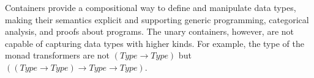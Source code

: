 \begin{code}%
\>[0]\AgdaSpace{}%
\AgdaSymbol{:}\AgdaSpace{}%
\AgdaSpace{}%
\AgdaSpace{}%
\AgdaSpace{}%
\AgdaSpace{}%
\<%
\\
\>[0]\AgdaSpace{}%
\AgdaSpace{}%
\AgdaSymbol{=}\AgdaSpace{}%
\<%
\\
\>[0]\AgdaSpace{}%
\AgdaSymbol{(}\AgdaSpace{}%
\AgdaSymbol{)}\AgdaSpace{}%
\AgdaSymbol{=}\AgdaSpace{}%
\<%
\\
\>[0]\AgdaSpace{}%
\AgdaSymbol{(}\AgdaSpace{}%
\AgdaSpace{}%
\AgdaSymbol{)}\AgdaSpace{}%
\AgdaSymbol{=}\AgdaSpace{}%
\AgdaSpace{}%
\<%
\\
\>[0]\AgdaSpace{}%
\AgdaSymbol{(}\AgdaSpace{}%
\AgdaSpace{}%
\AgdaSpace{}%
\AgdaSymbol{)}\AgdaSpace{}%
\AgdaSymbol{=}\AgdaSpace{}%
\AgdaSpace{}%
\AgdaSpace{}%
\<%
\\
\>[0]\<%
\end{code}

Containers provide a compositional way to define and manipulate data types, making their semantics explicit and supporting generic programming, categorical analysis, and proofs about programs. The unary containers, however, are not capable of capturing data types with higher kinds. For example, the type of the monad transformers\cite{liang1995monad} are not $(Type \to Type)$ but $((Type \to Type) \to Type \to Type)$.

\begin{code}%
\>[0]\AgdaSpace{}%
\AgdaSymbol{:}\AgdaSpace{}%
\AgdaSymbol{(}\AgdaSpace{}%
\AgdaSpace{}%
\AgdaSymbol{)}\AgdaSpace{}%
\AgdaSpace{}%
\AgdaSpace{}%
\AgdaSpace{}%
\<%
\\
\>[0]\AgdaSpace{}%
\AgdaSpace{}%
\AgdaSpace{}%
\AgdaSymbol{=}\AgdaSpace{}%
\AgdaSpace{}%
\AgdaSymbol{(}\AgdaSpace{}%
\AgdaSpace{}%
\AgdaSymbol{)}\<%
\end{code}

